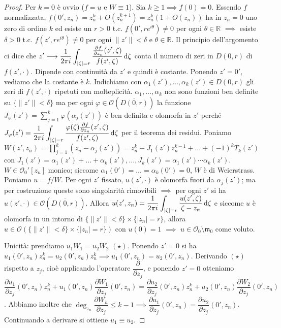 \begin{proof}
  Per $k=0$ è ovvio ($\underline{f}=\underline{u}$ e $W \equiv 1$). Sia $k \ge 1 \implies \underline{f}(0)=0$.
  Essendo $\underline{f}$ normalizzata, $f(0',z_n)=z_n^k+O(z_n^{k+1})=z_n^k(1+O(z_n))$ ha in $z_n=0$ uno zero di ordine $k$ ed esiste un $r>0$ t.c. $\underline{f}(0',re^{i\theta})\not=0$ per ogni $\theta \in \mathbb{R}$ $\implies$ esiste $\delta>0$ t.c. $\underline{f}(z',re^{i\theta})\not=0$ per ogni $\|z'\|<\delta$ e $\theta \in \mathbb{R}$.
  Il principio dell'argomento ci dice che $\displaystyle z' \longmapsto \frac{1}{2\pi i} \int_{|\zeta|=r} \frac{\frac{\partial f}{\partial z_n}(z',\zeta)}{f(z',\zeta)}\mathop{}\!\mathrm{d}\zeta$ conta il numero di zeri in $D(0,r)$ di $f(z',\cdot)$. Dipende con continuità da $z'$ e quindi è costante. Ponendo $z'=0'$, vediamo che la costante è $k$.
  Indichiamo con $\alpha_1(z'),\dots,\alpha_k(z') \in D(0,r)$ gli zeri di $f(z',\cdot)$ ripetuti con molteplicità. $\alpha_1,\dots,\alpha_k$ non sono funzioni ben definite su $\{\|z'\|<\delta\}$ ma per ogni $\varphi \in \mathcal{O}(\overline{D(0,r)})$ la funzione $\displaystyle J_{\varphi}(z')=\sum_{j=1}^k \varphi(\alpha_j(z'))$ è ben definita e olomorfa in $z'$ perché
  $\displaystyle J_{\varphi}(z')=\frac{1}{2\pi i}\int_{|\zeta|=r} \frac{\varphi(\zeta)\frac{\partial f}{\partial z_n}(z',\zeta)}{f(z',\zeta)}\mathop{}\!\mathrm{d}\zeta$ per il teorema dei residui. Poniamo $\displaystyle W(z',z_n)=\prod_{j=1}^k (z_n-\alpha_j(z'))=z_n^k-J_1(z')z_n^{k-1}+\dots+(-1)^kT_k(z')$ con $J_1(z')=\alpha_1(z')+\dots+\alpha_k(z'),\dots, J_k(z')=\alpha_1(z')\cdots\alpha_k(z')$.
  $W \in \mathcal{O}_0'[z_n]$ monico; siccome $\alpha_1(0')=\dots=\alpha_k(0')=0$, $W$ è di Weierstrass. Poniamo $u=f/W$. Per ogni $z'$ fissato, $u(z',\cdot)$ è olomorfa fuori da $\alpha_j(z')$; ma per costruzione queste sono singolarità rimovibili $\implies$ per ogni $z'$ si ha $u(z',\cdot) \in \mathcal{O}(\overline{D(0,r)})$.
  Allora $\displaystyle u(z',z_n)=\frac{1}{2\pi i} \int_{|\zeta|=r} \frac{u(z',\zeta)}{\zeta-z_n}\mathop{}\!\mathrm{d}\zeta$ e siccome $u$ è olomorfa in un intorno di $\{\|z'\|<\delta\}\times\{|z_n|=r\}$, allora $u \in \mathcal{O}(\{\|z'\|<\delta\}\times\{|z_n|=r\})$ con $u(0)=1$ $\implies$ $u \in \mathcal{O}_0\setminus\mathfrak{m}_0$ come voluto.

  Unicità: prendiamo $u_1W_1=u_2W_2$ $(\star)$. Ponendo $z'=0$ si ha $u_1(0',z_n)z_n^k=u_2(0',z_n)z_n^k \implies u_1(0',z_n)=u_2(0',z_n)$.
  Derivando $(\star)$ rispetto a $z_j$, cioè applicando l'operatore $\dfrac{\partial}{\partial z_j}$, e ponendo $z'=0$ otteniamo $\dfrac{\partial u_1}{\partial z_j}(0',z_n)z_n^k+u_1(0',z_n)\dfrac{\partial W_1}{\partial z_j}(0',z_n)=\dfrac{\partial u_2}{\partial z_j}(0',z_n)z_n^k+u_2(0',z_n)\dfrac{\partial W_2}{\partial z_j}(0',z_n)$.
  Abbiamo inoltre che $\deg_{z_n}{\dfrac{\partial W_h}{\partial z_j}} \le k-1 \implies \dfrac{\partial u_1}{\partial z_j}(0',z_n)=\dfrac{\partial u_2}{\partial z_j}(0',z_n)$. Continuando a derivare si ottiene $u_1 \equiv u_2$.
\end{proof}

